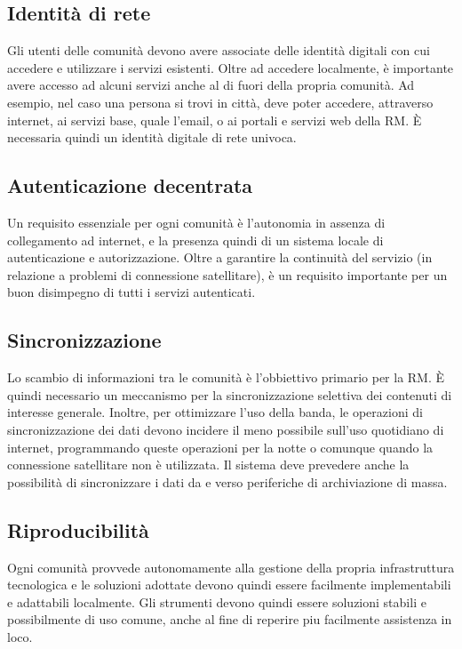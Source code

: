 \subsection{Identità di rete}
Gli utenti delle comunità devono avere associate delle identità
digitali con cui accedere e utilizzare i servizi esistenti. Oltre ad
accedere localmente, è importante avere accesso ad alcuni servizi
anche al di fuori della propria comunità. Ad esempio, nel caso una
persona si trovi in città, deve poter accedere, attraverso internet,
ai servizi base, quale l'email, o ai portali e servizi web della
RM. È necessaria quindi un identità digitale di rete univoca.

\subsection{Autenticazione decentrata}
\label{sec:AutDec}
Un requisito essenziale per ogni comunità è l'autonomia in assenza di
collegamento ad internet, e la presenza quindi di un sistema locale di
autenticazione e autorizzazione. Oltre a garantire la continuità del
servizio (in relazione a problemi di connessione satellitare), è un
requisito importante per un buon disimpegno di tutti i servizi
autenticati.

\subsection{Sincronizzazione}
Lo scambio di informazioni tra le comunità è l'obbiettivo primario per
la RM. È quindi necessario un meccanismo per la sincronizzazione
selettiva dei contenuti di interesse generale. Inoltre, per
ottimizzare l'uso della banda, le operazioni di sincronizzazione dei
dati devono incidere il meno possibile sull'uso quotidiano di internet,
programmando queste operazioni per la notte o comunque quando la
connessione satellitare non è utilizzata. Il sistema deve prevedere
anche la possibilità di sincronizzare i dati da e verso periferiche di
archiviazione di massa.

\subsection{Riproducibilità}
Ogni comunità provvede autonomamente alla gestione della propria infrastruttura
tecnologica e le soluzioni adottate devono quindi essere facilmente
implementabili e adattabili localmente. Gli strumenti devono quindi essere
soluzioni stabili e possibilmente di uso comune, anche al fine di
reperire piu facilmente assistenza in loco. 

